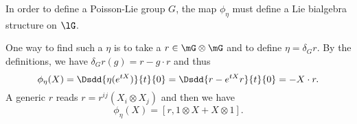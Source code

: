 \begin{theorem}
	In order to define a Poisson-Lie group $G$, the map $\phi_{\eta}$ must define a Lie bialgebra structure on \( \lG\).
\end{theorem}


One way to find such a $\eta$ is to take a $r\in\mG\otimes\mG$ and to define $\eta=\delta_Gr$. By the definitions, we have $\delta_Gr(g)=r-g\cdot r$ and thus
\[
	\phi_{\eta}(X)=\Dsdd{ \eta( e^{tX}) }{t}{0}=\Dsdd{ r- e^{tX}r }{t}{0}=-X\cdot r.
\]
A generic $r$ reads $r=r^{ij}(X_i\otimes X_j)$ and then we have
\begin{equation}
	\phi_{\eta}(X)=[r,1\otimes X+X\otimes 1].
\end{equation}
